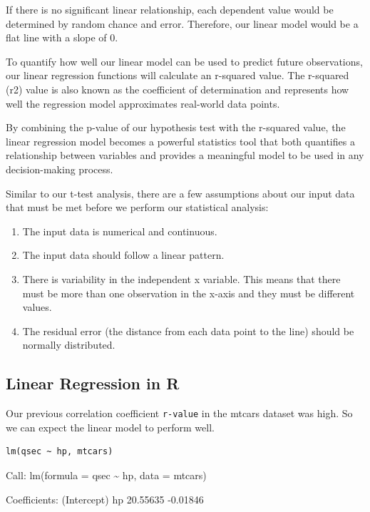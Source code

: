 \documentclass[11pt]{article}
\begin{document}
If there is no significant linear relationship, each dependent value would be determined by random chance and error. Therefore, our linear model would be a flat line with a slope of 0.

To quantify how well our linear model can be used to predict future observations, our linear regression functions will calculate an r-squared value. The r-squared (r2) value is also known as the coefficient of determination and represents how well the regression model approximates real-world data points.

By combining the p-value of our hypothesis test with the r-squared value, the linear regression model becomes a powerful statistics tool that both quantifies a relationship between variables and provides a meaningful model to be used in any decision-making process.

Similar to our t-test analysis, there are a few assumptions about our input data that must be met before we perform our statistical analysis:

\begin{enumerate}
\item The input data is numerical and continuous.
\item The input data should follow a linear pattern.
\item There is variability in the independent x variable. This means that there must be more than one observation in the x-axis and they must be different values.
\item The residual error (the distance from each data point to the line) should be normally distributed.
\end{enumerate}

\subsection{Linear Regression in R}
\label{sec:org3ee0ac1}

Our previous correlation coefficient \texttt{r-value} in the mtcars dataset was high. So we can expect the linear model to perform well.

\begin{verbatim}
lm(qsec ~ hp, mtcars)
\end{verbatim}

\begin{org}


Call:
lm(formula = qsec \textasciitilde{} hp, data = mtcars)

Coefficients:
(Intercept)           hp
   20.55635     -0.01846
\end{org}
\end{document}
